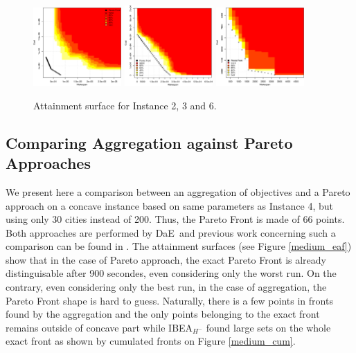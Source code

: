 \documentclass{llncs}
\def\DAE{{\sc DaE}}
\begin{document}
\begin{figure}[h!]
  \centering
      \includegraphics[width=0.30\textwidth]{large_4_att_area}
      \includegraphics[width=0.30\textwidth]{large_9_att_area}
      \includegraphics[width=0.30\textwidth]{large_7_att_area}
 \caption{\label{instance5} Attainment surface for Instance 2, 3 and 6.}
\end{figure}

\subsection{Comparing Aggregation against Pareto Approaches}

We present here a comparison between an aggregation of objectives and a Pareto approach on a concave instance based on same parameters as Instance 4, but using only 30 cities instead of 200. Thus, the Pareto Front is made of 66 points. Both approaches are performed by \DAE\ and previous work concerning such a comparison can be found in \cite{khouadjia:hal-00820617,khouadjia:hal-00820634}.
The attainment surfaces (see Figure \ref{medium_eaf}) show that in the case of Pareto approach, the exact Pareto Front is already distinguisable after 900 secondes, even considering only the worst run. On the contrary, even considering only the best run, in the case of aggregation, the Pareto Front shape is hard to guess. Naturally, there is a few points in fronts found by the aggregation and the only points belonging to the exact front remains outside of concave part while IBEA$_{H^-}$ found large sets on the whole exact front as shown by cumulated fronts on Figure \ref{medium_cum}.
\end{document}
